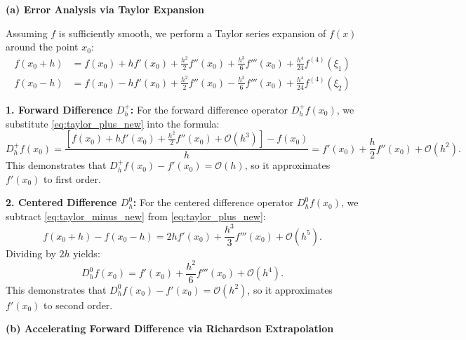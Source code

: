 \begin{solution}
\textbf{(a) Error Analysis via Taylor Expansion}

Assuming $f$ is sufficiently smooth, we perform a Taylor series expansion of $f(x)$ around the point $x_0$:
\begin{align}
    f(x_0 + h) &= f(x_0) + h f'(x_0) + \frac{h^2}{2} f''(x_0) + \frac{h^3}{6} f'''(x_0) + \frac{h^4}{24} f^{(4)}(\xi_1) \label{eq:taylor_plus_new} \\
    f(x_0 - h) &= f(x_0) - h f'(x_0) + \frac{h^2}{2} f''(x_0) - \frac{h^3}{6} f'''(x_0) + \frac{h^4}{24} f^{(4)}(\xi_2) \label{eq:taylor_minus_new}
\end{align}

\textbf{1. Forward Difference $D_h^+$:}
For the forward difference operator $D_h^+ f(x_0)$, we substitute \eqref{eq:taylor_plus_new} into the formula:
\[
    D_h^+ f(x_0) = \frac{\left[f(x_0) + h f'(x_0) + \frac{h^2}{2} f''(x_0) + \mathcal{O}(h^3)\right] - f(x_0)}{h} = f'(x_0) + \frac{h}{2} f''(x_0) + \mathcal{O}(h^2).
\]
This demonstrates that $D_h^+ f(x_0) - f'(x_0) = \mathcal{O}(h)$, so it approximates $f'(x_0)$ to first order.

\textbf{2. Centered Difference $D_h^0$:}
For the centered difference operator $D_h^0 f(x_0)$, we subtract \eqref{eq:taylor_minus_new} from \eqref{eq:taylor_plus_new}:
\[
    f(x_0 + h) - f(x_0 - h) = 2h f'(x_0) + \frac{h^3}{3} f'''(x_0) + \mathcal{O}(h^5).
\]
Dividing by $2h$ yields:
\[
    D_h^0 f(x_0) = f'(x_0) + \frac{h^2}{6} f'''(x_0) + \mathcal{O}(h^4).
\]
This demonstrates that $D_h^0 f(x_0) - f'(x_0) = \mathcal{O}(h^2)$, so it approximates $f'(x_0)$ to second order.

\textbf{(b) Accelerating Forward Difference via Richardson Extrapolation}


\end{solution}
